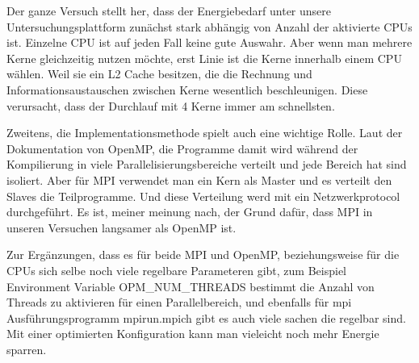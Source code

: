 Der ganze Versuch stellt her, dass der Energiebedarf unter unsere Untersuchungsplattform zunächst stark abhängig von Anzahl der aktivierte CPUs ist. Einzelne CPU ist auf jeden Fall keine gute Auswahr. Aber wenn man mehrere Kerne gleichzeitig nutzen möchte, erst Linie ist die Kerne innerhalb einem CPU wählen. Weil sie ein L2 Cache besitzen, die die Rechnung und Informationsaustauschen zwischen Kerne wesentlich beschleunigen. Diese verursacht, dass der Durchlauf mit 4 Kerne immer am schnellsten.

Zweitens, die Implementationsmethode spielt auch eine wichtige Rolle. Laut der Dokumentation von OpenMP, die Programme damit wird während der Kompilierung in viele Parallelisierungsbereiche verteilt und jede Bereich hat sind isoliert. Aber für MPI verwendet man ein Kern als Master und es verteilt den Slaves die Teilprogramme. Und diese Verteilung werd mit ein Netzwerkprotocol durchgeführt. Es ist, meiner meinung nach, der Grund dafür, dass MPI in unseren Versuchen langsamer als OpenMP ist. 

Zur Ergänzungen, dass es für beide MPI und OpenMP, beziehungsweise für die CPUs sich selbe noch viele regelbare Parameteren gibt, zum Beispiel Environment Variable OPM\_NUM\_THREADS bestimmt die Anzahl von Threads zu aktivieren für einen Parallelbereich, und ebenfalls für mpi Ausführungsprogramm mpirun.mpich gibt es auch viele sachen die regelbar sind. Mit einer optimierten Konfiguration kann man vieleicht noch mehr Energie sparren.
